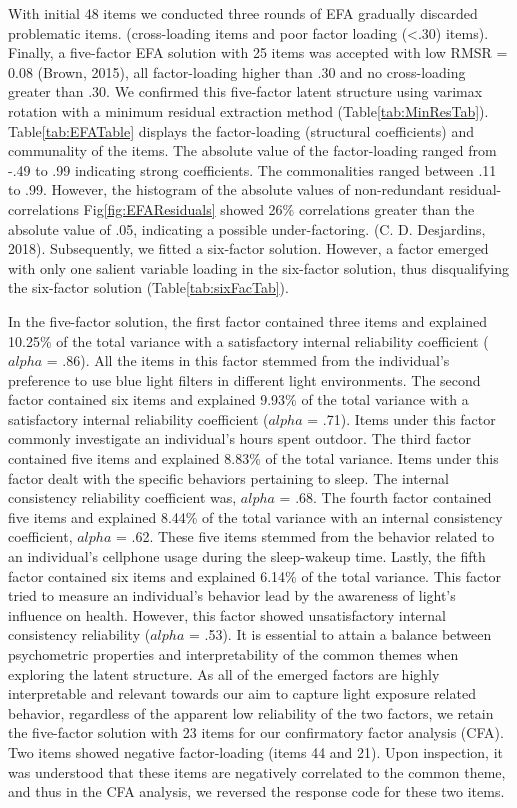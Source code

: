 \documentclass[
  english,
  man]{apa6}
\begin{document}
With initial 48 items we conducted three rounds of EFA gradually discarded problematic items. (cross-loading items and poor factor loading (\textless.30) items). Finally, a five-factor EFA solution with 25 items was accepted with low RMSR = 0.08 (Brown, 2015), all factor-loading higher than .30 and no cross-loading greater than .30. We confirmed this five-factor latent structure using varimax rotation with a minimum residual extraction method (Table\ref{tab:MinResTab}). Table\ref{tab:EFATable} displays the factor-loading (structural coefficients) and communality of the items. The absolute value of the factor-loading ranged from -.49 to .99 indicating strong coefficients. The commonalities ranged between .11 to .99. However, the histogram of the absolute values of non-redundant residual-correlations Fig\ref{fig:EFAResiduals} showed 26\% correlations greater than the absolute value of .05, indicating a possible under-factoring. (C. D. Desjardins, 2018). Subsequently, we fitted a six-factor solution. However, a factor emerged with only one salient variable loading in the six-factor solution, thus disqualifying the six-factor solution (Table\ref{tab:sixFacTab}).

In the five-factor solution, the first factor contained three items and explained 10.25\% of the total variance with a satisfactory internal reliability coefficient (\(alpha\) = .86). All the items in this factor stemmed from the individual's preference to use blue light filters in different light environments. The second factor contained six items and explained 9.93\% of the total variance with a satisfactory internal reliability coefficient (\(alpha\) = .71). Items under this factor commonly investigate an individual's hours spent outdoor. The third factor contained five items and explained 8.83\% of the total variance. Items under this factor dealt with the specific behaviors pertaining to sleep. The internal consistency reliability coefficient was, \(alpha\) = .68. The fourth factor contained five items and explained 8.44\% of the total variance with an internal consistency coefficient, \(alpha\) = .62. These five items stemmed from the behavior related to an individual's cellphone usage during the sleep-wakeup time. Lastly, the fifth factor contained six items and explained 6.14\% of the total variance. This factor tried to measure an individual's behavior lead by the awareness of light's influence on health. However, this factor showed unsatisfactory internal consistency reliability (\(alpha\) = .53). It is essential to attain a balance between psychometric properties and interpretability of the common themes when exploring the latent structure. As all of the emerged factors are highly interpretable and relevant towards our aim to capture light exposure related behavior, regardless of the apparent low reliability of the two factors, we retain the five-factor solution with 23 items for our confirmatory factor analysis (CFA). Two items showed negative factor-loading (items 44 and 21). Upon inspection, it was understood that these items are negatively correlated to the common theme, and thus in the CFA analysis, we reversed the response code for these two items.
\end{document}
